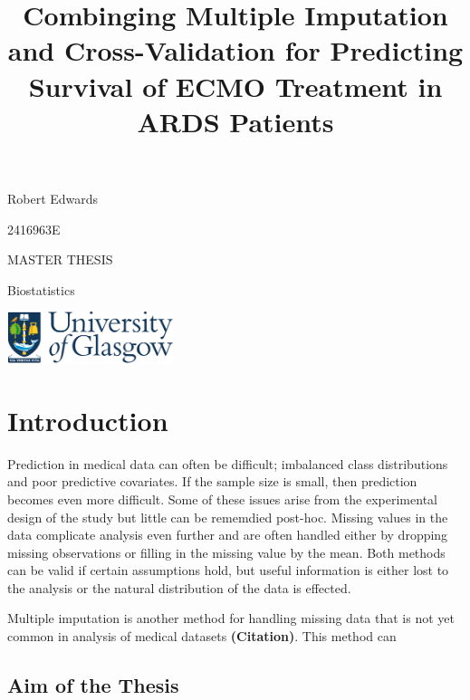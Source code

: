 \documentclass[12pt,]{article}
\title{Combinging Multiple Imputation and Cross-Validation for Predicting
Survival of ECMO Treatment in ARDS Patients}
\author{}
\date{}
\begin{document}
\maketitle

\vspace{2cm}

\begin{center}
Robert Edwards 

\vspace{0.125cm}
2416963E


\vspace{1cm}
MASTER THESIS 

\vspace{0.125cm}
Biostatistics

\vspace{10cm}
  \includegraphics[height = 1.5cm]{images/GUlogo.png}
\end{center}

\newpage 

\setcounter{tocdepth}{2} \tableofcontents   \newpage

\newpage

\section{Introduction}\label{introduction}

Prediction in medical data can often be difficult; imbalanced class
distributions and poor predictive covariates. If the sample size is
small, then prediction becomes even more difficult. Some of these issues
arise from the experimental design of the study but little can be
rememdied post-hoc. Missing values in the data complicate analysis even
further and are often handled either by dropping missing observations or
filling in the missing value by the mean. Both methods can be valid if
certain assumptions hold, but useful information is either lost to the
analysis or the natural distribution of the data is effected.

Multiple imputation is another method for handling missing data that is
not yet common in analysis of medical datasets \textbf{(Citation)}. This
method can

\subsection{Aim of the Thesis}\label{aim-of-the-thesis}
\end{document}

